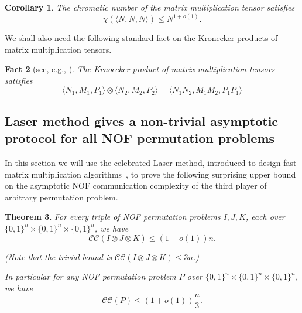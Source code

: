 \documentclass[10pt,a4paper]{article}
\newtheorem{theorem}{Theorem}
\newtheorem{fact}[theorem]{Fact}
\newtheorem{corollary}[theorem]{Corollary}
\newcommand{\F}{\mathbb{F}}
\newcommand{\cc}{\mathcal{CC}}
\newcommand{\acc}{\underline{\cc}}
\newcommand{\inprod}[1]{\langle #1 \rangle}
\begin{document}
\begin{corollary}
\label{cor:mat-mult-coloring}
The chromatic number of the matrix multiplication tensor satisfies
\begin{equation*}
    \chi(\inprod{N,N,N}) \leq N^{1 + o(1)}.
\end{equation*}
\end{corollary}

We shall also need the following standard fact on the Kronecker products of matrix multiplication tensors.
\begin{fact}[see, e.g., {\cite[{Page 24}]{B13}}]
    \label{fct:mat-mult-product}
    The Krnoecker product of matrix multiplication tensors satisfies
    \begin{equation*}
        \inprod{N_1, M_1, P_1} \otimes \inprod{N_2, M_2, P_2} = \inprod{N_1 N_2, M_1 M_2, P_1 P_1}
    \end{equation*}
\end{fact}

\subsection{Laser method gives a non-trivial asymptotic protocol for all NOF permutation problems}
In this section we will use the celebrated Laser method, introduced to design fast matrix multiplication algorithms~\cite{S86,CW87}, to prove the following surprising upper bound on the asymptotic NOF communication complexity of the third player of arbitrary permutation problem.

\begin{theorem}
\label{thm:laser-method-ub}
For every triple of NOF permutation problems $I, J, K$, each over $\{0,1\}^n \times \{0,1\}^n \times \{0,1\}^n$, we have
\begin{equation*}
    \cc(I \otimes J \otimes K) \leq (1 + o(1))n.
\end{equation*}

(Note that the trivial bound is $\cc(I \otimes J \otimes K) \leq 3n$.)

In particular for any NOF permutation problem $P$ over $\{0,1\}^n \times \{0,1\}^n \times \{0,1\}^n$, we have 
\begin{equation*}
    \acc(P) \leq (1 + o(1))\frac{n}{3}.
\end{equation*}
\end{theorem}


\end{document}
